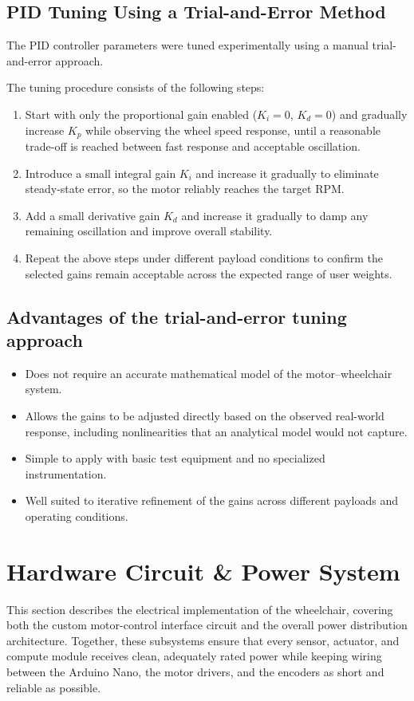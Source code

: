 \subsection*{PID Tuning Using a Trial-and-Error Method}
The PID controller parameters were tuned experimentally using a manual trial-and-error approach.

The tuning procedure consists of the following steps:
\begin{enumerate}
\item Start with only the proportional gain enabled ($K_i = 0$, $K_d = 0$) and gradually increase $K_p$ while observing the wheel speed response, until a reasonable trade-off is reached between fast response and acceptable oscillation.
\item Introduce a small integral gain $K_i$ and increase it gradually to eliminate steady-state error, so the motor reliably reaches the target RPM.
\item Add a small derivative gain $K_d$ and increase it gradually to damp any remaining oscillation and improve overall stability.
\item Repeat the above steps under different payload conditions to confirm the selected gains remain acceptable across the expected range of user weights.
\end{enumerate}

\subsection*{Advantages of the trial-and-error tuning approach}
\begin{itemize}
    \item Does not require an accurate mathematical model of the motor--wheelchair system.
    \item Allows the gains to be adjusted directly based on the observed real-world response, including nonlinearities that an analytical model would not capture.
    \item Simple to apply with basic test equipment and no specialized instrumentation.
    \item Well suited to iterative refinement of the gains across different payloads and operating conditions.
\end{itemize}





\section{Hardware Circuit \& Power System}
This section describes the electrical implementation of the wheelchair, covering both the custom motor-control interface circuit and the overall power distribution architecture. Together, these subsystems ensure that every sensor, actuator, and compute module receives clean, adequately rated power while keeping wiring between the Arduino Nano, the motor drivers, and the encoders as short and reliable as possible.

